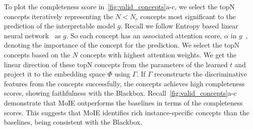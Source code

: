 To plot the completeness score in~\cref{fig:valid_concepts}a-c, we select the topN concepts iteratively representing the $N < N_c$ concepts most significant to the prediction of the interpretable model $g$. Recall we follow Entropy based linear neural network~\cite{barbiero2022entropy} as $g$. So each concept has an associated attention score, $\alpha$ in $g$~\cite{barbiero2022entropy}, denoting the importance of the concept for the prediction. We select the topN concepts based on the $N$ concepts with highest attention weights. We get the linear direction of these topN concepts from the parameters of the learned $t$ and project it to the embedding space $\Phi$ using $\Gamma$. If $\Gamma$ reconstructs the discriminative features from the concepts successfully, the concepts achieves high completeness scores, showing faithfulness with the Blackbox. Recall~\cref{fig:valid_concepts}a-c demonstrate that MoIE outperforms the baselines in terms of the completeness scores. This suggests that MoIE identifies rich instance-specific concepts than the baselines, being consistent with the Blackbox.